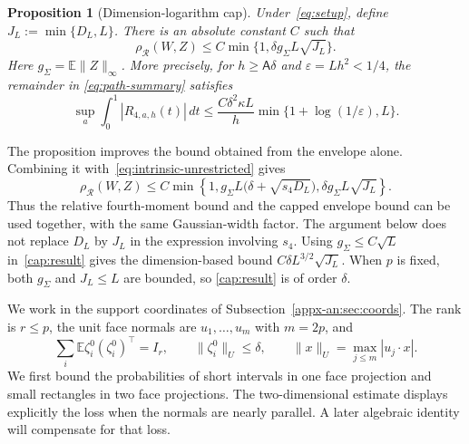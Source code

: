 \documentclass[11pt,letterpaper,twoside,leqno]{article}
\theoremstyle{bookplain}
\newtheorem{proposition}{Proposition}
\theoremstyle{bookremark}
\newcommand{\E}{\mathbb E}
\newcommand{\rh}{\rho_{\mathcal R}}
\begin{document}
\begin{proposition}[Dimension-logarithm cap]
\label{prop:dimension-cap}
Under~\eqref{eq:setup}, define $J_L:=\min\{D_L,L\}$. There is an
absolute constant $C$ such that
\begin{equation}
 \rh(W,Z)\le C\min\{1,\delta g_\Sigma L\sqrt{J_L}\}.
 \label{cap:result}
\end{equation}
Here $g_\Sigma=\E\|Z\|_\infty$. More precisely, for
$h\ge\mathsf A\delta$ and $\varepsilon=Lh^2<1/4$, the remainder in
\eqref{eq:path-summary} satisfies
\begin{equation}
 \sup_a\int_0^1|R_{4,a,h}(t)|\,dt
 \le\frac{C\delta^2\kappa L}h
       \min\{1+\log(1/\varepsilon),L\}.
 \label{cap:integrated}
\end{equation}
\end{proposition}

The proposition improves the bound obtained from the envelope
alone. Combining it with~\eqref{eq:intrinsic-unrestricted} gives
\[
 \rh(W,Z)\le C\min\left\{1,
 g_\Sigma L\bigl(\delta+\sqrt{s_4D_L}\bigr),
 \delta g_\Sigma L\sqrt{J_L}\right\}.
\]
Thus the relative fourth-moment bound and the capped envelope
bound can be used together, with the same Gaussian-width factor.
The argument below does not replace $D_L$ by $J_L$ in the expression
involving $s_4$. Using $g_\Sigma\le C\sqrt L$ in~\eqref{cap:result}
gives the dimension-based bound $C\delta L^{3/2}\sqrt{J_L}$.
When $p$ is fixed, both $g_\Sigma$ and $J_L\le L$ are bounded, so
\eqref{cap:result} is of order $\delta$.

We work in the support coordinates of
Subsection~\ref{appx-an:sec:coords}. The rank is $r\le p$,
the unit face normals are $u_1,\ldots,u_m$ with $m=2p$, and
\[
 \sum_i\E\zeta_i^0(\zeta_i^0)^\top=I_r,
 \qquad \|\zeta_i^0\|_U\le\delta,
 \qquad \|x\|_U=\max_{j\le m}|u_j\cdot x|.
\]
We first bound the probabilities of short intervals in one face
projection and small rectangles in two face projections. The
two-dimensional estimate displays explicitly the loss when the
normals are nearly parallel. A later algebraic identity will
compensate for that loss.
\end{document}
